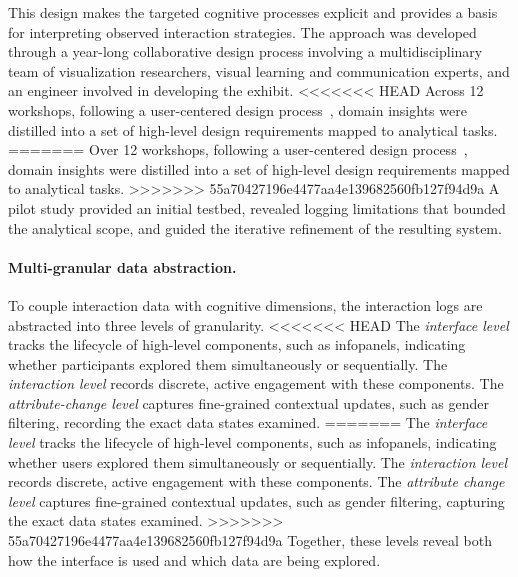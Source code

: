 This design makes the targeted cognitive processes explicit and provides a basis for interpreting observed interaction strategies.
The approach was developed through a year-long collaborative design process involving a multidisciplinary team of visualization researchers, visual learning and communication experts, and an engineer involved in developing the exhibit.
<<<<<<< HEAD
Across 12 workshops, following a user-centered design process~\cite{christmann2022visualizing}, domain insights were distilled into a set of high-level design requirements mapped to analytical tasks.
=======
Over 12 workshops, following a user-centered design process~\cite{christmann2022visualizing}, domain insights were distilled into a set of high-level design requirements mapped to analytical tasks.
>>>>>>> 55a70427196e4477aa4e139682560fb127f94d9a
A pilot study provided an initial testbed, revealed logging limitations that bounded the analytical scope, and guided the iterative refinement of the resulting system.

\paragraph{Multi-granular data abstraction.}
To couple interaction data with cognitive dimensions, the interaction logs are abstracted into three levels of granularity.
<<<<<<< HEAD
The \textit{interface level} tracks the lifecycle of high-level components, such as infopanels, indicating whether participants explored them simultaneously or sequentially.
The \textit{interaction level} records discrete, active engagement with these components.
The \textit{attribute-change level} captures fine-grained contextual updates, such as gender filtering, recording the exact data states examined.
=======
The \textit{interface level} tracks the lifecycle of high-level components, such as infopanels, indicating whether users explored them simultaneously or sequentially.
The \textit{interaction level} records discrete, active engagement with these components.
The \textit{attribute change level} captures fine-grained contextual updates, such as gender filtering, capturing the exact data states examined.
>>>>>>> 55a70427196e4477aa4e139682560fb127f94d9a
Together, these levels reveal both how the interface is used and which data are being explored.


